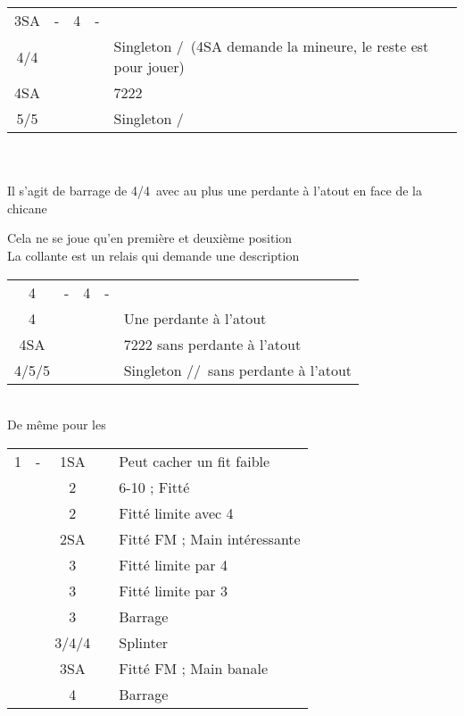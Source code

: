 \documentclass[a4paper, oneside, 11pt]{report}
\begin{document}
	\begin{tabular}{cccc|l}
	3SA & - & 4\carreau & - &\\
	4\coeur/4\pique &&&& Singleton \pique/\coeur\ (4SA demande la mineure, le reste est pour jouer)\\
	4SA &&&& 7222\\
	5\trefle/5\carreau &&&& Singleton \carreau/\trefle\\
	\end{tabular}\\\\
	
	Il s'agit de barrage de 4\coeur/4\pique\ avec au plus une perdante à l'atout en face de la chicane
	
	Cela ne se joue qu'en première et deuxième position\\
	
	La collante est un relais qui demande une description\\
	\begin{tabular}{cccc|l}
	4\trefle & - & 4\carreau & - &\\
	4\coeur &&&& Une perdante à l'atout\\
	4SA &&&& 7222 sans perdante à l'atout\\
	4\pique/5\trefle/5\carreau &&&& Singleton \pique/\trefle/\carreau\ sans perdante à l'atout\\
	\end{tabular}\\
	De même pour les \pique\\
	
	\begin{tabular}{cccc|l}
	1\coeur & - & 1SA && Peut cacher un fit faible\\
	&& 2\coeur && 6-10 ; Fitté\\
	&& 2\pique && Fitté limite avec 4\pique\\
	&& 2SA && Fitté FM ; Main intéressante\\
	&& 3\trefle && Fitté limite par 4\\
	&& 3\carreau && Fitté limite par 3\\
	&& 3\coeur && Barrage\\
	&& 3\pique/4\trefle/4\carreau && Splinter\\
	&& 3SA && Fitté FM ; Main banale\\
	&& 4\coeur && Barrage\\
	\end{tabular}\\\\
\end{document}
